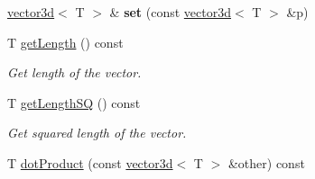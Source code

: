 \begin{DoxyCompactItemize}
\item 
\hyperlink{classirr_1_1core_1_1vector3d}{vector3d}$<$ T $>$ \& {\bfseries set} (const \hyperlink{classirr_1_1core_1_1vector3d}{vector3d}$<$ T $>$ \&p)\hypertarget{classirr_1_1core_1_1vector3d_aaa41e0e1f747d4d83af8ac6b621184da}{}\label{classirr_1_1core_1_1vector3d_aaa41e0e1f747d4d83af8ac6b621184da}

\item 
T \hyperlink{classirr_1_1core_1_1vector3d_ab0f95138bd31d82b5486237c8e49a2d5}{get\+Length} () const \hypertarget{classirr_1_1core_1_1vector3d_ab0f95138bd31d82b5486237c8e49a2d5}{}\label{classirr_1_1core_1_1vector3d_ab0f95138bd31d82b5486237c8e49a2d5}

\begin{DoxyCompactList}\small\item\em Get length of the vector. \end{DoxyCompactList}\item 
T \hyperlink{classirr_1_1core_1_1vector3d_ad72df96d0e280b0e6383be273f94f6ae}{get\+Length\+SQ} () const 
\begin{DoxyCompactList}\small\item\em Get squared length of the vector. \end{DoxyCompactList}\item 
T \hyperlink{classirr_1_1core_1_1vector3d_a0b247d39047c0e51ff16d0118bb396ab}{dot\+Product} (const \hyperlink{classirr_1_1core_1_1vector3d}{vector3d}$<$ T $>$ \&other) const \hypertarget{classirr_1_1core_1_1vector3d_a0b247d39047c0e51ff16d0118bb396ab}{}\label{classirr_1_1core_1_1vector3d_a0b247d39047c0e51ff16d0118bb396ab}


\end{DoxyCompactItemize}
